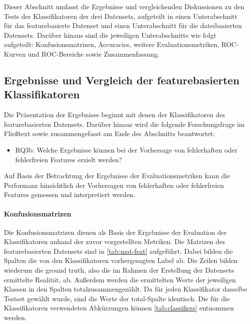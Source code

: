 Dieser Abschnitt umfasst die Ergebnisse und vergleichenden Diskussionen zu den Tests der Klassifikatoren der drei Datensets, aufgeteilt in einen Unterabschnitt für das featurebasierte Datenset und einen Unterabschnitt für die dateibasierten Datensets. Darüber hinaus sind die jeweiligen Unterabschnitte wie folgt aufgeteilt: Konfusionsmatrizen, Accuracies, weitere Evaluationsmetriken, ROC-Kurven und ROC-Bereiche sowie Zusammenfassung.

\subsection{Ergebnisse und Vergleich der featurebasierten Klassifikatoren}
\label{feat-results}

Die Präsentation der Ergebnisse beginnt mit denen der Klassifikatoren des featurebasierten Datensets. Darüber hinaus wird die folgende Forschungsfrage im Fließtext sowie zusammengefasst am Ende des Abschnitts beantwortet:
\vspace{-\topsep}
\begin{itemize}
\setlength{\itemsep}{-2pt}
 \item RQ3b: Welche Ergebnisse können bei der Vorhersage von fehlerhaften oder fehlerfreien Features erzielt werden?
\end{itemize}

Auf Basis der Betrachtung der Ergebnisse der Evaluationsmetriken kann die Performanz hinsichtlich der Vorhersagen von fehlerhaften oder fehlerfreien Features gemessen und interpretiert werden.  

\paragraph{Konfusionsmatrizen}
Die Konfusionsmatrizen dienen als Basis der Ergebnisse der Evaluation der Klassifikatoren anhand der zuvor vorgestellten Metriken. Die Matrizen des featurebasierten Datensets sind in \autoref{tab:mat-feat} aufgeführt. Dabei bilden die Spalten die von den Klassifikatoren vorhergesagten Label ab. Die Zeilen bilden wiederum die \glqq ground truth\grqq{}, also die im Rahmen der Erstellung der Datensets ermittelte Realität, ab. Außerdem werden die ermittelten Werte der jeweiligen Klassen in den Spalten \glqq total\grqq zusammengezählt. Da für jeden Klassifikator dasselbe Testset gewählt wurde, sind die Werte der \glqq total\grqq-Spalte identisch. Die für die Klassifikatoren verwendeten Abkürzungen können \autoref{tab:classifiers} entnommen werden.

